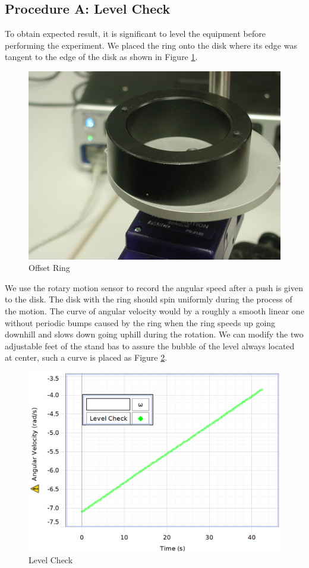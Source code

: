 \subsection{Procedure A: Level Check}
To obtain expected result, it is significant to level the equipment before performing the experiment. We placed the ring onto the disk where its edge was tangent to the edge of the disk as shown in Figure \ref{fig:LevelCheck}.\par
\begin{figure}[H]
  \centering\includegraphics[width=15cm]{figLevelCheck.png}
  \caption{Offset Ring}
  \label{fig:LevelCheck}
\end{figure}
We use the rotary motion sensor to record the angular speed after a push is given to the disk. The disk with the ring should spin uniformly during the process of the motion. The curve of angular velocity would by a roughly a smooth linear one without periodic bumps caused by the ring when the ring speeds up going downhill and slows down going uphill during the rotation. We can modify the two adjustable feet of the stand bas to assure the bubble of the level always located at center, such a curve is placed as Figure \ref{fig:LevelCheck2}.
\begin{figure}[H]
  \centering\includegraphics[width=15cm]{figLevelCheck2.png}
  \caption{Level Check}
  \label{fig:LevelCheck2}
\end{figure}

